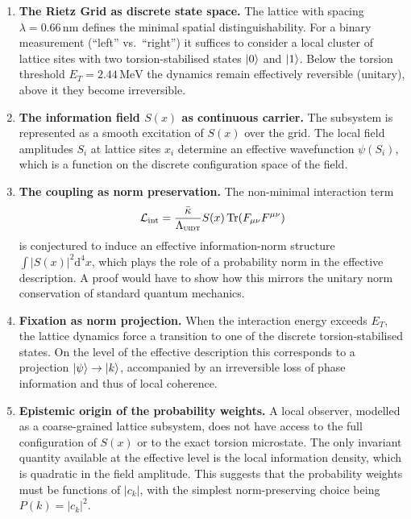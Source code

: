 \documentclass[12pt,a4paper,twoside]{article}
\theoremstyle{plain}
\theoremstyle{definition}
\theoremstyle{remark}
\newcommand{\UIDT}{\textsc{uidt}}
\newcommand{\MeV}{\,\mathrm{MeV}}
\newcommand{\Sx}{S(x)}
\newcommand{\ETorsion}{2.44\MeV}                    %
\begin{document}
\begin{enumerate}
  \item \textbf{The Rietz Grid as discrete state space.}
  The lattice with spacing $\lambda = 0.66\,\mathrm{nm}$ defines the minimal
  spatial distinguishability. For a binary measurement (``left'' vs.\ ``right'')
  it suffices to consider a local cluster of lattice sites with two
  torsion-stabilised states $\ket{0}$ and $\ket{1}$. Below the torsion
  threshold $E_T = \ETorsion$ the dynamics remain effectively reversible
  (unitary), above it they become irreversible.

  \item \textbf{The information field $S(x)$ as continuous carrier.}
  The subsystem is represented as a smooth excitation of $S(x)$ over the
  grid. The local field amplitudes $S_i$ at lattice sites $x_i$ determine
  an effective wavefunction $\psi(S_i)$, which is a function on the discrete
  configuration space of the field.

  \item \textbf{The coupling as norm preservation.}
  The non-minimal interaction term
  \[
    \mathcal{L}_{\mathrm{int}}
    = \frac{\bar{\kappa}}{\Lambda_{\UIDT}}\Sx\,
      \mathrm{Tr}(F_{\mu\nu}F^{\mu\nu})
  \]
  is conjectured to induce an effective information-norm structure
  $\int |S(x)|^2 \mathrm{d}^4x$, which plays the role of a probability norm
  in the effective description. A proof would have to show how this mirrors
  the unitary norm conservation of standard quantum mechanics.

  \item \textbf{Fixation as norm projection.}
  When the interaction energy exceeds $E_T$, the lattice dynamics force a
  transition to one of the discrete torsion-stabilised states. On the level
  of the effective description this corresponds to a projection
  $\ket{\psi} \to \ket{k}$, accompanied by an irreversible loss of phase
  information and thus of local coherence.

  \item \textbf{Epistemic origin of the probability weights.}
  A local observer, modelled as a coarse-grained lattice subsystem, does not
  have access to the full configuration of $S(x)$ or to the exact torsion
  microstate. The only invariant quantity available at the effective level
  is the local information density, which is quadratic in the field amplitude.
  This suggests that the probability weights must be functions of $|c_k|$,
  with the simplest norm-preserving choice being $P(k) = |c_k|^2$.
\end{enumerate}
\end{document}
